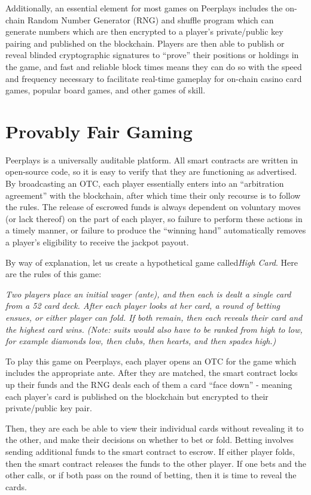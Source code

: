 \documentclass[a4paper,titlepage,final]{article}
\begin{document}
Additionally, an essential element for most games on Peerplays includes the on-chain Random Number Generator (RNG) and shuffle program which can generate numbers which are then encrypted to a player’s private/public key pairing and published on the blockchain. Players are then able to publish or reveal blinded cryptographic signatures to “prove” their positions or holdings in the game, and fast and reliable block times means they can do so with the speed and frequency necessary to facilitate real-time gameplay for on-chain casino card games, popular board games, and other games of skill.

\section{Provably Fair Gaming}

Peerplays is a universally auditable platform. All smart contracts are written in open-source code, so it is easy to verify that they are functioning as advertised. By broadcasting an OTC, each player essentially enters into an “arbitration agreement” with the blockchain, after which time their only recourse is to follow the rules. The release of escrowed funds is always dependent on voluntary moves (or lack thereof) on the part of each player, so failure to perform these actions in a timely manner, or failure to produce the “winning hand” automatically removes a player’s eligibility to receive the jackpot payout.

By way of explanation, let us create a hypothetical game called \textit{​High Card}. Here are the rules of this game:

\textit{​Two players place an initial wager (ante), and then each is dealt a single card from a 52 card deck. After each player looks at her card, a round of betting ensues, or either player can fold. If both remain, then each reveals their card and the highest card wins. (Note: suits would also have to be ranked from high to low, for example diamonds low, then clubs, then hearts, and then spades high.)}

To play this game on Peerplays, each player opens an OTC for the game which includes the appropriate ante. After they are matched, the smart contract locks up their funds and the RNG deals each of them a card “face down” - meaning each player’s card is published on the blockchain but encrypted to their private/public key pair.

Then, they are each be able to view their individual cards without revealing it to the other, and make their decisions on whether to bet or fold. Betting involves sending additional funds to the smart contract to escrow. If either player folds, then the smart contract releases the funds to the other player. If one bets and the other calls, or if both pass on the round of betting, then it is time to reveal the cards. 
\end{document}
